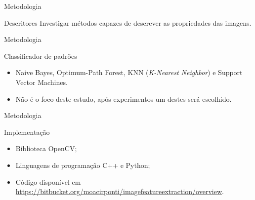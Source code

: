 \documentclass{beamer}
\begin{document}
\begin{frame}{Metodologia}
\begin{block}{Descritores}
\justifying
Investigar métodos capazes de descrever as propriedades das imagens.
\end{block}
\end{frame}
\begin{frame}{Metodologia}
\begin{block}{Classificador de padrões}
\justifying
\begin{itemize}
\item Naive Bayes, Optimum-Path Forest, KNN (\textit{K-Nearest Neighbor}) e Support Vector Machines. %
\item Não é o foco deste estudo, após experimentos um destes será escolhido.
\end{itemize}
\end{block}
\end{frame}
\begin{frame}{Metodologia}
\begin{block}{Implementação}
\justifying
\begin{itemize}
\item Biblioteca OpenCV; %
\item Linguagens de programação C++ e Python;
\item Código disponível em \url{https://bitbucket.org/moacirponti/imagefeatureextraction/overview}. 
\end{itemize}
\end{block}
\end{frame}
\end{document}
